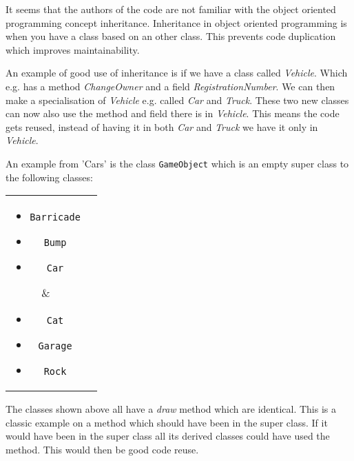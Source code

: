 \label{sprint1_inheritance}
It seems that the authors of the code are not familiar with the object oriented programming concept inheritance.
Inheritance in object oriented programming is when you have a class based on an other class.
This prevents code duplication which improves maintainability.

An example of good use of inheritance is if we have a class called \textit{Vehicle}.
Which e.g. has a method \textit{ChangeOwner} and a field \textit{RegistrationNumber}.
We can then make a specialisation of \textit{Vehicle} e.g. called \textit{Car} and \textit{Truck}.
These two new classes can now also use the method and field there is in \textit{Vehicle}.
This means the code gets reused, instead of having it in both \textit{Car} and \textit{Truck} we have it only in \textit{Vehicle}.

An example from 'Cars' is the class \lstinline!GameObject! which is an empty super class to the following classes:

\begin{tabular}{ c  c }
\parbox{\textwidth/2}{
\begin{itemize}
\item \lstinline!Barricade!
\item \lstinline!Bump!
\item \lstinline!Car!
\end{itemize}} &
\parbox{\textwidth/2}{
\begin{itemize}
\item \lstinline!Cat!
\item \lstinline!Garage!
\item \lstinline!Rock!
\end{itemize}
}
\end{tabular}
The classes shown above all have a \textit{draw} method which are identical.
This is a classic example on a method which should have been in the super class.
If it would have been in the super class all its derived classes could have used the method.
This would then be good code reuse.